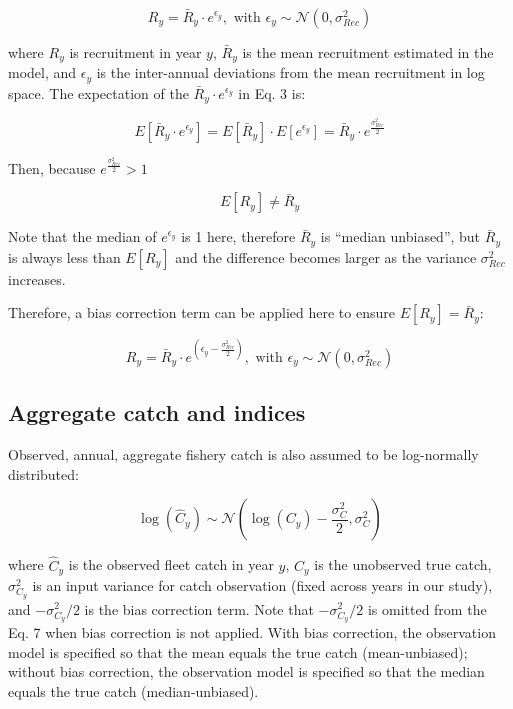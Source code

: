 \documentclass[
  12pt,
]{article}
\begin{document}
\begin{equation}
R_{y} = \bar{R}_{y} \cdot e^{\epsilon_{y}}, \text{ with } \epsilon_y \sim \mathcal{N}(0, \sigma_{Rec}^2)
\end{equation}

where \(R_{y}\) is recruitment in year \(y\), \(\bar{R}_{y}\) is the
mean recruitment estimated in the model, and \(\epsilon_{y}\) is the
inter-annual deviations from the mean recruitment in log space. The
expectation of the \(\bar{R}_{y} \cdot e^{\epsilon_{y}}\) in Eq. 3 is:

\begin{equation}
E[\bar{R}_{y} \cdot e^{\epsilon_{y}}] = E[\bar{R}_{y}] \cdot E[e^{\epsilon_{y}}] =
\bar{R}_{y} \cdot e^\frac{\sigma_{Rec}^2}{2}
\end{equation}

Then, because \(e^\frac{\sigma_{Rec}^2}{2} > 1\)

\begin{equation}
E[R_{y}] \neq \bar{R}_{y}
\end{equation}

Note that the median of \(e^{\epsilon_{y}}\) is 1 here, therefore
\(\bar{R}_{y}\) is ``median unbiased'', but \(\bar{R}_{y}\) is always
less than \(E[R_{y}]\) and the difference becomes larger as the variance
\(\sigma_{Rec}^2\) increases.

Therefore, a bias correction term can be applied here to ensure
\(E[R_{y}] = \bar{R}_{y}\):

\begin{equation}
R_{y} = \bar{R}_{y} \cdot e^{\left(\epsilon_{y} - \frac{\sigma_{Rec}^2}{2}\right)}, \text{ with } \epsilon_y \sim \mathcal{N}(0, \sigma_{Rec}^2)
\end{equation}

\hypertarget{aggregate-catch-and-indices}{%
\subsection{Aggregate catch and
indices}\label{aggregate-catch-and-indices}}

Observed, annual, aggregate fishery catch is also assumed to be
log-normally distributed:

\begin{equation}
\log(\hat{C}_{y}) \sim \mathcal{N} \left( \log(C_{y}) - \frac{\sigma^2_{C}}{2}, \sigma^2_{C} \right)
\end{equation}

where \(\hat{C}_{y}\) is the observed fleet catch in year \(y\),
\({C}_{y}\) is the unobserved true catch, \(\sigma^2_{C_{y}}\) is an
input variance for catch observation (fixed across years in our study),
and \(-\sigma^2_{C_{y}}/2\) is the bias correction term. Note that
\(-\sigma^2_{C_{y}}/2\) is omitted from the Eq. 7 when bias correction
is not applied. With bias correction, the observation model is specified
so that the mean equals the true catch (mean-unbiased); without bias
correction, the observation model is specified so that the median equals
the true catch (median-unbiased).
\end{document}
